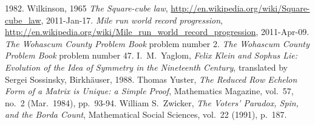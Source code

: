 \begin{thebibliography}{\makebox[2em][c]{{}\hfil{}}}
  1982.
  Wilkinson,
  1965
  \emph{The Square-cube law},
  \url{http://en.wikipedia.org/wiki/Square-cube_law},
  2011-Jan-17.
  \emph{Mile run world record progression},
  \url{http://en.wikipedia.org/wiki/Mile_run_world_record_progression},
  2011-Apr-09.
  \emph{The Wohascum County Problem Book}
  problem number 2.
  \emph{The Wohascum County Problem Book}
  problem number 47.
  I.\ M.~Yaglom,
  \emph{Felix Klein and Sophus Lie: Evolution of the Idea of
   Symmetry in the Nineteenth Century},
  translated by Sergei Sossinsky,
  Birkh\"auser,
  1988.
  Thomas Yuster,
  \emph{The Reduced Row Echelon Form of a Matrix is Unique: a Simple Proof},
  Mathematics Magazine,
  vol.~57, no.~2 (Mar.~1984),
  pp.~93-94.
  William S.~Zwicker,
  \emph{The Voters' Paradox, Spin, and the Borda Count},
  Mathematical Social Sciences,
  vol.~22 (1991),
  p.~187. 
\end{thebibliography}
